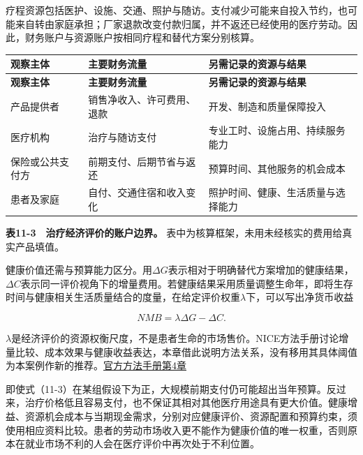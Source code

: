 \documentclass[UTF8,fontset=windows,12pt,a4paper,oneside,openany]{ctexbook}
\begin{document}
疗程资源包括医护、设施、交通、照护与随访。支付减少可能来自投入节约，也可能来自转由家庭承担；厂家退款改变付款归属，并不返还已经使用的医疗劳动。因此，财务账户与资源账户按相同疗程和替代方案分别核算。

\begingroup\footnotesize\setlength{\tabcolsep}{4pt}\renewcommand{\arraystretch}{1.25}
\begin{longtable}{>{\raggedright\arraybackslash}p{}>{\raggedright\arraybackslash}p{}>{\raggedright\arraybackslash}p{}}
\toprule
\textbf{观察主体} & \textbf{主要财务流量} & \textbf{另需记录的资源与结果} \\
\midrule\endfirsthead
\toprule
\textbf{观察主体} & \textbf{主要财务流量} & \textbf{另需记录的资源与结果} \\
\midrule\endhead
\bottomrule\endfoot
产品提供者 & 销售净收入、许可费用、退款 & 开发、制造和质量保障投入 \\
医疗机构 & 治疗与随访支付 & 专业工时、设施占用、持续服务能力 \\
保险或公共支付方 & 前期支付、后期节省与返还 & 预算时间、其他服务的机会成本 \\
患者及家庭 & 自付、交通住宿和收入变化 & 照护时间、健康、生活质量与选择能力 \\
\end{longtable}\endgroup


\textbf{表11-3　治疗经济评价的账户边界。} 表中为核算框架，未用未经核实的费用给真实产品填值。

健康价值还需与预算能力区分。用\(\Delta G\)表示相对于明确替代方案增加的健康结果，\(\Delta C\)表示同一评价视角下的增量费用。若健康结果采用质量调整生命年，即将生存时间与健康相关生活质量结合的度量，在给定评价权重\(\lambda\)下，可以写出净货币收益

\[
NMB=\lambda\Delta G-\Delta C.
\tag{11-3}
\]

\(\lambda\)是经济评价的资源权衡尺度，不是患者生命的市场售价。NICE方法手册讨论增量比较、成本效果与健康收益表达，本章借此说明方法关系，没有移用其具体阈值为本案例作新的推荐。\href{https://www.nice.org.uk/process/pmg36/chapter/economic-evaluation-2}{官方方法手册第4章}

即使式（11-3）在某组假设下为正，大规模前期支付仍可能超出当年预算。反过来，治疗价格低且容易支付，也不保证其相对其他医疗用途具有更大价值。健康增益、资源机会成本与当期现金需求，分别对应健康评价、资源配置和预算约束，须使用相应资料比较。患者的劳动市场收入更不能作为健康价值的唯一权重，否则原本在就业市场不利的人会在医疗评价中再次处于不利位置。
\end{document}
